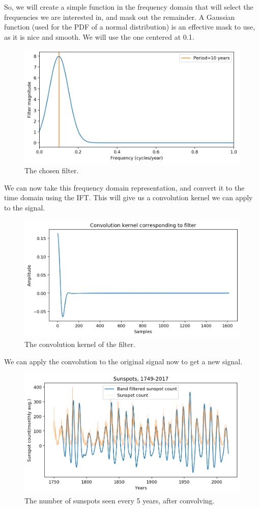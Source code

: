 \documentclass[a4paper, openany]{memoir}
\begin{document}
So, we will create a simple function in the frequency domain that will select the frequencies we are interested in, and mask out the remainder. A Gaussian function (used for the PDF of a normal distribution) is an effective mask to use, as it is nice and smooth. We will use the one centered at 0.1.
\begin{figure}[H]
    \centering
    \includegraphics[scale=0.6]{src/6.28 chosen frequency.png}
    \caption{The chosen filter.}
\end{figure}
\noindent We can now take this frequency domain representation, and convert it to the time domain using the IFT. This will give us a convolution kernel we can apply to the signal.
\begin{figure}[H]
    \centering
    \includegraphics[scale=0.6]{src/6.29 sunspots convolution kernel.png}
    \caption{The convolution kernel of the filter.}
\end{figure}
\noindent We can apply the convolution to the original signal now to get a new signal.
\begin{figure}[H]
    \centering
    \includegraphics[scale=0.6]{src/6.30 sunspots convolved.png}
    \caption{The number of sunspots seen every 5 years, after convolving.}
\end{figure}
\end{document}
